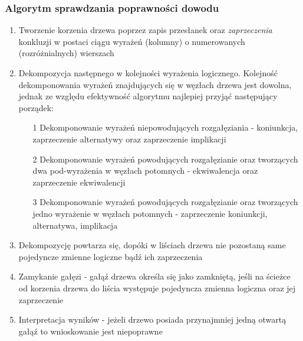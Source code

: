 \documentclass[12pt,a4paper,titlepage]{article}
\begin{document}
\subsubsection{Algorytm sprawdzania poprawności dowodu}
\begin{enumerate}
	\item Tworzenie korzenia drzewa poprzez zapis przesłanek oraz \textit{zaprzeczenia} konkluzji w postaci ciągu wyrażeń (kolumny) o numerowanych (rozróżnialnych) wierszach
	\item Dekompozycja następnego w kolejności wyrażenia logicznego. Kolejność dekomponowania wyrażeń znajdujących się w węzłach drzewa jest dowolna, jednak ze względu efektywność algorytmu najlepiej przyjąć następujący porządek:
	\begin{itemize}
	\item[1] Dekomponowanie wyrażeń niepowodujących rozgałęziania - koniunkcja, zaprzeczenie alternatywy oraz zaprzeczenie implikacji
	\item[2] Dekomponowanie wyrażeń powodujących rozgałęzianie oraz tworzących dwa pod-wyrażenia w węzłach potomnych - ekwiwalencja oraz zaprzeczenie ekwiwalencji
	\item[3] Dekomponowanie wyrażeń powodujących rozgałęzianie oraz tworzących jedno wyrażenie w węzłach potomnych - zaprzeczenie koniunkcji, alternatywa, implikacja
	\end{itemize}
	\item Dekompozycję powtarza się, dopóki w liściach drzewa nie pozostaną same pojedyncze zmienne logiczne bądź ich zaprzeczenia
	\item Zamykanie gałęzi - gałąź drzewa określa się jako zamkniętą, jeśli na ścieżce od korzenia drzewa do liścia występuje pojedyncza zmienna logiczna oraz jej zaprzeczenie
	\item Interpretacja wyników - jeżeli drzewo posiada przynajmniej jedną otwartą gałąź to wnioskowanie jest niepoprawne
\end{enumerate}
\end{document}
